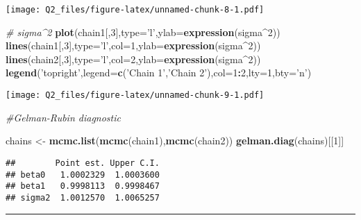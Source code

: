 \documentclass[]{article}
\newenvironment{Shaded}{\begin{snugshade}}{\end{snugshade}}
\newcommand{\KeywordTok}[1]{\textcolor[rgb]{0.13,0.29,0.53}{\textbf{#1}}}
\newcommand{\DataTypeTok}[1]{\textcolor[rgb]{0.13,0.29,0.53}{#1}}
\newcommand{\DecValTok}[1]{\textcolor[rgb]{0.00,0.00,0.81}{#1}}
\newcommand{\StringTok}[1]{\textcolor[rgb]{0.31,0.60,0.02}{#1}}
\newcommand{\CommentTok}[1]{\textcolor[rgb]{0.56,0.35,0.01}{\textit{#1}}}
\newcommand{\OperatorTok}[1]{\textcolor[rgb]{0.81,0.36,0.00}{\textbf{#1}}}
\newcommand{\NormalTok}[1]{#1}
\begin{document}
\texttt{[image: Q2\_files/figure-latex/unnamed-chunk-8-1.pdf]}

\begin{Shaded}
\begin{Highlighting}[]
\CommentTok{# sigma^2}
\KeywordTok{plot}\NormalTok{(chain1[,}\DecValTok{3}\NormalTok{],}\DataTypeTok{type=}\StringTok{'l'}\NormalTok{,}\DataTypeTok{ylab=}\KeywordTok{expression}\NormalTok{(sigma}\OperatorTok{^}\DecValTok{2}\NormalTok{))}
\KeywordTok{lines}\NormalTok{(chain1[,}\DecValTok{3}\NormalTok{],}\DataTypeTok{type=}\StringTok{'l'}\NormalTok{,}\DataTypeTok{col=}\DecValTok{1}\NormalTok{,}\DataTypeTok{ylab=}\KeywordTok{expression}\NormalTok{(sigma}\OperatorTok{^}\DecValTok{2}\NormalTok{))}
\KeywordTok{lines}\NormalTok{(chain2[,}\DecValTok{3}\NormalTok{],}\DataTypeTok{type=}\StringTok{'l'}\NormalTok{,}\DataTypeTok{col=}\DecValTok{2}\NormalTok{,}\DataTypeTok{ylab=}\KeywordTok{expression}\NormalTok{(sigma}\OperatorTok{^}\DecValTok{2}\NormalTok{))}
\KeywordTok{legend}\NormalTok{(}\StringTok{'topright'}\NormalTok{,}\DataTypeTok{legend=}\KeywordTok{c}\NormalTok{(}\StringTok{'Chain 1'}\NormalTok{,}\StringTok{'Chain 2'}\NormalTok{),}\DataTypeTok{col=}\DecValTok{1}\OperatorTok{:}\DecValTok{2}\NormalTok{,}\DataTypeTok{lty=}\DecValTok{1}\NormalTok{,}\DataTypeTok{bty=}\StringTok{'n'}\NormalTok{) }
\end{Highlighting}
\end{Shaded}

\texttt{[image: Q2\_files/figure-latex/unnamed-chunk-9-1.pdf]}

\begin{Shaded}
\begin{Highlighting}[]
\CommentTok{#Gelman-Rubin diagnostic}

\NormalTok{chains <-}\StringTok{ }\KeywordTok{mcmc.list}\NormalTok{(}\KeywordTok{mcmc}\NormalTok{(chain1),}\KeywordTok{mcmc}\NormalTok{(chain2))}
\KeywordTok{gelman.diag}\NormalTok{(chains)[[}\DecValTok{1}\NormalTok{]]}
\end{Highlighting}
\end{Shaded}

\begin{verbatim}
##        Point est. Upper C.I.
## beta0   1.0002329  1.0003600
## beta1   0.9998113  0.9998467
## sigma2  1.0012570  1.0065257
\end{verbatim}

\begin{center}\rule{0.5\linewidth}{\linethickness}\end{center}
\end{document}
